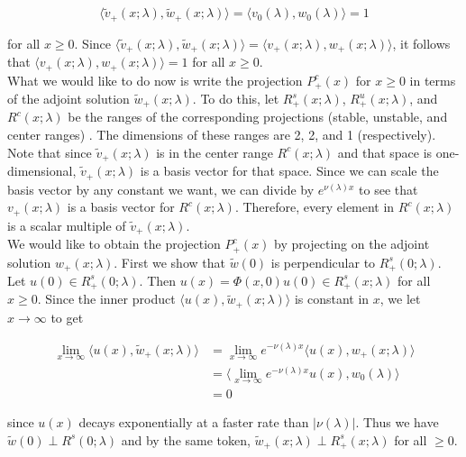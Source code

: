 \documentclass[12pt]{article}
\begin{document}
\[
\langle \tilde{v}_+(x; \lambda), \tilde{w}_+(x; \lambda) \rangle = \langle v_0(\lambda), w_0(\lambda) \rangle = 1
\]

for all $x \geq 0$. Since $\langle \tilde{v}_+(x; \lambda), \tilde{w}_+(x; \lambda) \rangle = \langle v_+(x; \lambda), w_+(x; \lambda) \rangle$, it follows that $\langle v_+(x; \lambda), w_+(x; \lambda) \rangle = 1$ for all $x \geq 0$.\\

What we would like to do now is write the projection $P^c_+(x)$ for $x \geq 0$ in terms of the adjoint solution $\tilde{w}_+(x; \lambda)$. To do this, let $R^s_+(x; \lambda)$, $R^u_+(x; \lambda)$, and $R^c(x; \lambda)$ be the ranges of the corresponding projections (stable, unstable, and center ranges)
. The dimensions of these ranges are 2, 2, and 1 (respectively). Note that since $\tilde{v}_+(x; \lambda)$ is in the center range $R^c(x; \lambda)$ and that space is one-dimensional, $\tilde{v}_+(x; \lambda)$ is a basis vector for that space. Since we can scale the basis vector by any constant we want, we can divide by $e^{\nu(\lambda) x }$ to see that $v_+(x; \lambda)$ is a basis vector for $R^c(x; \lambda)$. Therefore, every element in $R^c(x; \lambda)$ is a scalar multiple of $\tilde{v}_+(x; \lambda)$. \\

We would like to obtain the projection $P^c_+(x)$ by projecting on the adjoint solution $w_+(x; \lambda)$. First we show that $\tilde{w}(0)$ is perpendicular to $R^s_+(0; \lambda)$. Let $u(0) \in R^s_+(0; \lambda)$. Then $u(x) = \Phi(x, 0)u(0) \in R^s_+(x; \lambda)$ for all $x \geq 0$. Since the inner product $\langle u(x), \tilde{w}_+(x; \lambda) \rangle$ is constant in $x$, we let $x \rightarrow \infty$ to get

\begin{align*}
\lim_{x \rightarrow \infty} \langle u(x), \tilde{w}_+(x; \lambda) \rangle &= \lim_{x \rightarrow \infty} e^{-\nu(\lambda) x} \langle u(x), w_+(x; \lambda) \rangle \\
&= \langle \lim_{x \rightarrow \infty} e^{-\nu(\lambda) x} u(x), w_0(\lambda) \rangle \\
&= 0
\end{align*}

since $u(x)$ decays exponentially at a faster rate than $|\nu(\lambda)|$. Thus we have $\tilde{w}(0) \perp R^s(0; \lambda)$ and by the same token, $\tilde{w}_+(x; \lambda) \perp R^s_+(x; \lambda)$ for all $ \geq 0$.\\
\end{document}
